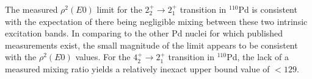 The measured $\rho^2(E0)$ limit for the $2_2^+ \rightarrow 2_1^+$ transition in $^{110}$Pd is consistent with the expectation of there being negligible mixing between these two intrinsic excitation bands. In comparing to the other Pd nuclei for which published measurements exist, the small magnitude of the limit appears to be consistent with the $\rho^2(E0)$ values. For the $4^+_2 \rightarrow 2^+_1$ transition in $^{110}$Pd, the lack of a measured mixing ratio yields a relatively inexact upper bound value of $<129$. 

\endinput

Any text after an \endinput is ignored.
You could put scraps here or things in progress.



